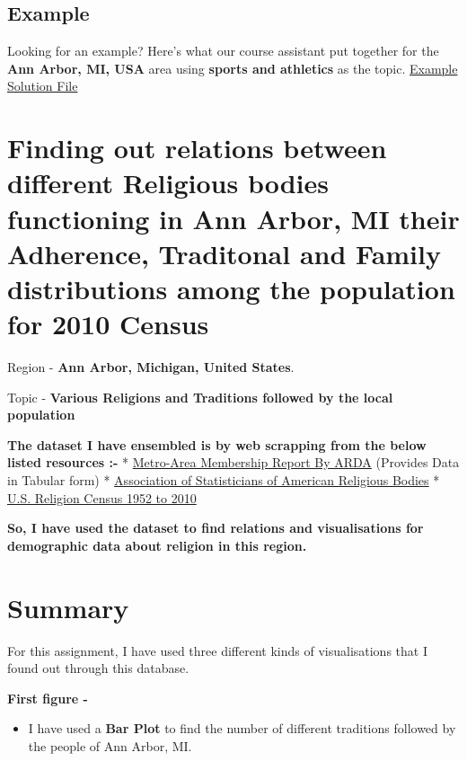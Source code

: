 \documentclass[11pt]{article}
\providecommand{\tightlist}{%
      \setlength{\itemsep}{0pt}\setlength{\parskip}{0pt}}
\begin{document}
\subsection{Example}\label{example}

Looking for an example? Here's what our course assistant put together
for the \textbf{Ann Arbor, MI, USA} area using \textbf{sports and
athletics} as the topic.
\href{./readonly/Assignment4_example.pdf}{Example Solution File}

    \section{Finding out relations between different Religious bodies
functioning in Ann Arbor, MI their Adherence, Traditonal and Family
distributions among the population for 2010
Census}\label{finding-out-relations-between-different-religious-bodies-functioning-in-ann-arbor-mi-their-adherence-traditonal-and-family-distributions-among-the-population-for-2010-census}

Region - \textbf{Ann Arbor, Michigan, United States}.

Topic - \textbf{Various Religions and Traditions followed by the local
population}

\textbf{The dataset I have ensembled is by web scrapping from the below
listed resources :-} *
\href{http://www.thearda.com/rcms2010/r/m/11460/rcms2010_11460_metro_name_2010.asp}{Metro-Area
Membership Report By ARDA} (Provides Data in Tabular form) *
\href{http://www.asarb.org/}{Association of Statisticians of American
Religious Bodies} * \href{http://www.usreligioncensus.org/}{U.S.
Religion Census 1952 to 2010}

\textbf{So, I have used the dataset to find relations and visualisations
for demographic data about religion in this region.}

    \section{Summary}\label{summary}

For this assignment, I have used three different kinds of visualisations
that I found out through this database.

\textbf{First figure - }

\begin{itemize}
\tightlist
\item
  I have used a \textbf{Bar Plot} to find the number of different
  traditions followed by the people of Ann Arbor, MI.
\end{itemize}
\end{document}
